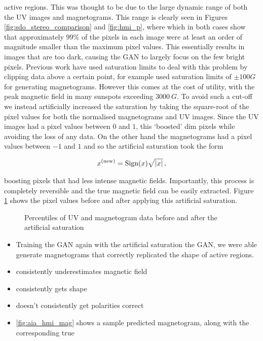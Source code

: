 \documentclass[11pt,a4paper,onecolumn]{report}
\begin{document}
\begin{itemize}
  active regions. This was thought to be due to the large dynamic range of both
  the UV images and magnetograms. This range is clearly seen in Figures
  \ref{fig:sdo_stereo_comparison} and \ref{fig:hmi_p}, where which in both cases
  show that approximately $99\%$ of the pixels in each image were at least an
  order of magnitude smaller than the maximum pixel values. This essentially
  results in images that are too dark, causing the GAN to largely focus on the
  few bright pixels. Previous work have used saturation limits to deal with this
  problem by clipping data above a certain point, \citet{Kim2019} for example
  used saturation limits of $\pm 100G$ for generating magnetograms. However this
  comes at the cost of utility, with the peak magnetic field in many sunspots
  exceeding $\SI[]{3000}[]{G}$. To avoid such a cut-off we instead artificially
  increased the saturation by taking the square-root of the pixel values for
  both the normalised magnetograms and UV images. Since the UV images had a
  pixel values between $0$ and $1$, this `boosted' dim pixels while
  avoiding the loss of any data. On the other hand the magnetograms had a
  pixel values between $-1$ and $1$ and so the artificial saturation took the form
  
\begin{align}
  x^{(\text{new})} = \text{Sign}(x)\sqrt{\absolutevalue{x}}\, ,
\end{align}

boosting pixels that had less intense magnetic fields. Importantly, this process
is completely reversible and the true magnetic field can be easily extracted.
Figure \ref{fig:artificial_sat} shows the pixel values before and after applying
this artificial saturation. 



\end{itemize}


\begin{figure}
  \centering
  
  \caption{Percentiles of UV and magnetogram data before and after the artificial saturation}
  \label{fig:artificial_sat}
\end{figure}




\begin{itemize}
  \item Training the GAN again with the artificial saturation the GAN, we were able
  generate magnetograms that correctly replicated the shape of active regions.
  \item consistently underestimates magnetic field
  \item consistently gets shape
  \item doesn't consistently get polarities correct
  \item \ref{fig:aia_hmi_mag} shows a sample predicted magnetogram, along with
  the corresponding true 
\end{itemize}
\end{document}
